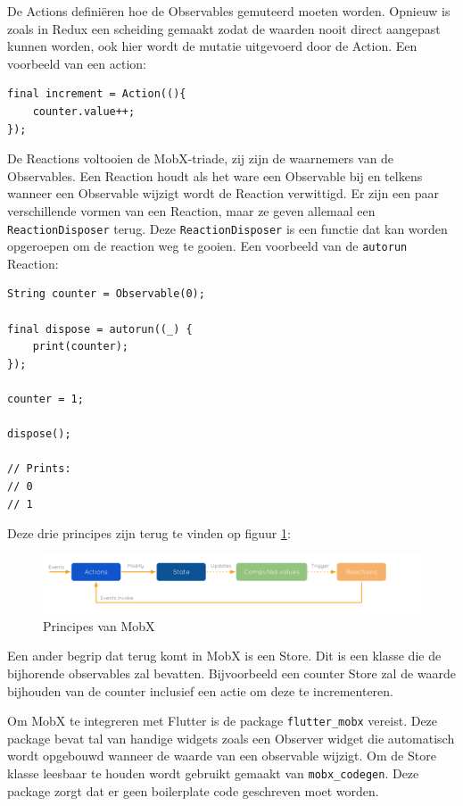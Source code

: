 De Actions definiëren hoe de Observables gemuteerd moeten worden. Opnieuw is zoals in Redux een scheiding gemaakt zodat de waarden nooit direct aangepast kunnen worden, ook hier wordt de mutatie uitgevoerd door de Action.
Een voorbeeld van een action:
\begin{verbatim}
final increment = Action((){
    counter.value++;
});    
\end{verbatim}

De Reactions voltooien de MobX-triade, zij zijn de waarnemers van de Observables. Een Reaction houdt als het ware een Observable bij en telkens wanneer een Observable wijzigt wordt de Reaction verwittigd. Er zijn een paar verschillende vormen van een Reaction, maar ze geven allemaal een \verb|ReactionDisposer| terug. Deze \verb|ReactionDisposer| is een functie dat kan worden opgeroepen om de reaction weg te gooien. Een voorbeeld van de \verb|autorun| Reaction:
\begin{verbatim}
String counter = Observable(0);

final dispose = autorun((_) {
    print(counter);
});

counter = 1;

dispose();

// Prints:
// 0
// 1
\end{verbatim}

Deze drie principes zijn terug te vinden op figuur \ref{fig:mobx-principles}:

\begin{figure}[H]
    \centering
    \includegraphics[width=\linewidth]{img/stand-van-zaken/mobx-principles.png}
    \caption{Principes van MobX \autocite{MobX2019}}
    \label{fig:mobx-principles}
\end{figure}

Een ander begrip dat terug komt in MobX is een Store. Dit is een klasse die de bijhorende observables zal bevatten. Bijvoorbeeld een counter Store zal de waarde bijhouden van de counter inclusief een actie om deze te incrementeren.

Om MobX te integreren met Flutter is de package \verb|flutter_mobx| vereist. Deze package bevat tal van handige widgets zoals een Observer widget die automatisch wordt opgebouwd wanneer de waarde van een observable wijzigt. 
Om de Store klasse leesbaar te houden wordt gebruikt gemaakt van \verb|mobx_codegen|. Deze package zorgt dat er geen boilerplate code geschreven moet worden. 
